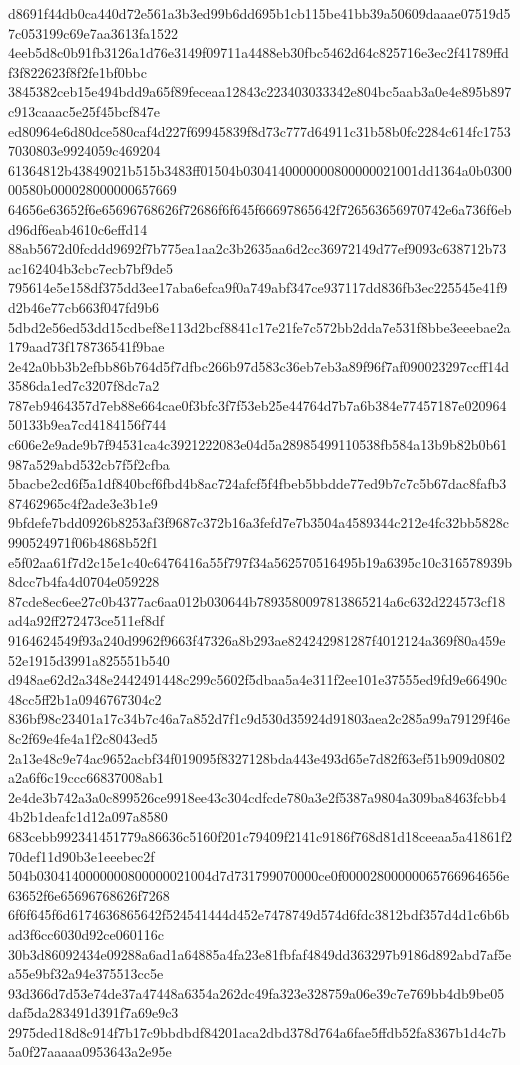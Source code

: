 {d8691f44db0ca440d72e561a3b3ed99b6dd695b1cb115be41bb39a50609daaae07519d57c053199c69e7aa3613fa1522
4eeb5d8c0b91fb3126a1d76e3149f09711a4488eb30fbc5462d64c825716e3ec2f41789ffdf3f822623f8f2fe1bf0bbc
3845382ceb15e494bdd9a65f89feceaa12843c223403033342e804bc5aab3a0e4e895b897c913caaac5e25f45bcf847e
ed80964e6d80dce580caf4d227f69945839f8d73c777d64911c31b58b0fc2284c614fc17537030803e9924059c469204
61364812b43849021b515b3483ff01504b0304140000000800000021001dd1364a0b030000580b000028000000657669
64656e63652f6e65696768626f72686f6f645f66697865642f726563656970742e6a736f6ebd96df6eab4610c6effd14
88ab5672d0fcddd9692f7b775ea1aa2c3b2635aa6d2cc36972149d77ef9093c638712b73ac162404b3cbc7ecb7bf9de5
795614e5e158df375dd3ee17aba6efca9f0a749abf347ce937117dd836fb3ec225545e41f9d2b46e77cb663f047fd9b6
5dbd2e56ed53dd15cdbef8e113d2bcf8841c17e21fe7c572bb2dda7e531f8bbe3eeebae2a179aad73f178736541f9bae
2e42a0bb3b2efbb86b764d5f7dfbc266b97d583c36eb7eb3a89f96f7af090023297ccff14d3586da1ed7c3207f8dc7a2
787eb9464357d7eb88e664cae0f3bfc3f7f53eb25e44764d7b7a6b384e77457187e02096450133b9ea7cd4184156f744
c606e2e9ade9b7f94531ca4c3921222083e04d5a28985499110538fb584a13b9b82b0b61987a529abd532cb7f5f2cfba
5bacbe2cd6f5a1df840bcf6fbd4b8ac724afcf5f4fbeb5bbdde77ed9b7c7c5b67dac8fafb387462965c4f2ade3e3b1e9
9bfdefe7bdd0926b8253af3f9687c372b16a3fefd7e7b3504a4589344c212e4fc32bb5828c990524971f06b4868b52f1
e5f02aa61f7d2c15e1c40c6476416a55f797f34a562570516495b19a6395c10c316578939b8dcc7b4fa4d0704e059228
87cde8ec6ee27c0b4377ac6aa012b030644b7893580097813865214a6c632d224573cf18ad4a92ff272473ce511ef8df
9164624549f93a240d9962f9663f47326a8b293ae824242981287f4012124a369f80a459e52e1915d3991a825551b540
d948ae62d2a348e2442491448c299c5602f5dbaa5a4e311f2ee101e37555ed9fd9e66490c48cc5ff2b1a0946767304c2
836bf98c23401a17c34b7c46a7a852d7f1c9d530d35924d91803aea2c285a99a79129f46e8c2f69e4fe4a1f2c8043ed5
2a13e48c9e74ac9652acbf34f019095f8327128bda443e493d65e7d82f63ef51b909d0802a2a6f6c19ccc66837008ab1
2e4de3b742a3a0c899526ce9918ee43c304cdfcde780a3e2f5387a9804a309ba8463fcbb44b2b1deafc1d12a097a8580
683cebb992341451779a86636c5160f201c79409f2141c9186f768d81d18ceeaa5a41861f270def11d90b3e1eeebec2f
504b0304140000000800000021004d7d731799070000ce0f00002800000065766964656e63652f6e65696768626f7268
6f6f645f6d6174636865642f524541444d452e7478749d574d6fdc3812bdf357d4d1c6b6bad3f6cc6030d92ce060116c
30b3d86092434e09288a6ad1a64885a4fa23e81fbfaf4849dd363297b9186d892abd7af5ea55e9bf32a94e375513cc5e
93d366d7d53e74de37a47448a6354a262dc49fa323e328759a06e39c7e769bb4db9be05daf5da283491d391f7a69e9c3
2975ded18d8c914f7b17c9bbdbdf84201aca2dbd378d764a6fae5ffdb52fa8367b1d4c7b5a0f27aaaaa0953643a2e95e
}
